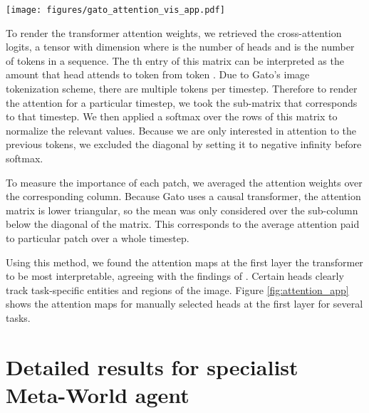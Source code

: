 \documentclass[10pt]{article} \usepackage[accepted]{tmlr}
\newcommand{\metaworld}{{Meta-World}}
\begin{document}
\begin{figure*}[t]
    \centering
    \texttt{[image: figures/gato\_attention\_vis\_app.pdf]}
    \caption{
    {\bf Attention maps.} Time-lapse attention maps from selected heads at the first layer for Atari Breakout, Boxing, Pong, Freeway, Procgen CoinRun, Bossfight, RGB Stacking, and DM Control Suite Cheetah.
    \small}
    \label{fig:attention_app}
\end{figure*}

To render the transformer attention weights, we retrieved the cross-attention logits, a tensor with dimension  where  is the number of heads and  is the number of tokens in a sequence. The th entry of this matrix can be interpreted as the amount that head  attends to token  from token .
Due to Gato's image tokenization scheme, there are multiple tokens per timestep. Therefore to render the attention for a particular timestep, we took the sub-matrix that corresponds to that timestep. We then applied a softmax over the rows of this matrix to normalize the relevant values. Because we are only interested in attention to the previous tokens, we excluded the diagonal by setting it to negative infinity before softmax.

To measure the importance of each patch, we averaged the attention weights over the corresponding column. Because Gato uses a causal transformer, the attention matrix is lower triangular, so the mean was only considered over the sub-column below the diagonal of the matrix.
This corresponds to the average attention paid to particular patch over a whole timestep.

Using this method, we found the attention maps at the first layer the transformer to be most interpretable, agreeing with the findings of \citet{abnar2020quantifying}. Certain heads clearly track task-specific entities and regions of the image. Figure \ref{fig:attention_app} shows the attention maps for manually selected heads at the first layer for several tasks.


\clearpage
\section{Detailed results for specialist \metaworld{} agent}\label{sec:mt50_results}
\end{document}
